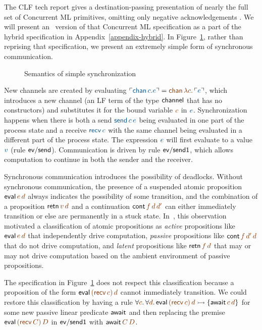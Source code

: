 The CLF tech report gives a destination-passing presentation of
nearly the full set of Concurrent ML primitives, omitting only
negative acknowledgements \cite{cervesato02concurrent}. We will
present an \sls~version of that Concurrent ML specification as a part
of the hybrid specification in Appendix~\ref{appendix-hybrid}.
In Figure~\ref{fig:dest-synch}, rather than reprising that
specification, we present an extremely simple form of synchronous
communication.


\begin{figure}
\caption{Semantics of simple synchronization}
\label{fig:dest-synch}
\end{figure}

New channels are created by evaluating $\interp{{\sf chan}\,c.e} =
\lf{{\sf chan}\,\lambda c.\,\interp{e}}$, which introduces a new channel
(an LF term of the type ${\sf channel}$ that has no constructors) and
substitutes it for the bound variable $\lf{c}$ in $\obj{e}$. 
Synchronization happens when
there is both a send $\obj{{\sf send}\,c\,e}$ being evaluated
in one part of the process state and a
receive $\obj{{\sf recv}\,c}$ with the same
channel being evaluated in a different part of the process state. 
The expression $\obj{e}$ will first evaluate to a value $\obj{v}$ 
(rule ${\sf ev/send}$). Communication is
driven by rule ${\sf ev/send1}$, which allows computation to continue
in both the sender and the receiver.

Synchronous communication introduces the possibility of
deadlocks. Without synchronous communication, the presence of a
suspended atomic proposition ${\sf eval}\,\lf{e}\,\lf{d}$ always
indicates the possibility of some transition, and the combination of a
proposition ${\sf retn}\,\lf{v}\,\lf{d}$ and a continuation ${\sf
  cont}\,\lf{f}\,\lf{d}\,\lf{d'}$ can either immediately transition or
else are permanently in a stuck
state. In~\cite{pfenning09substructural}, this observation motivated a
classification of atomic propositions as {\it active} propositions
like ${\sf eval}\,\lf{e}\,\lf{d}$ that independently drive
computation, {\it passive} propositions like ${\sf
  cont}\,\lf{f}\,\lf{d'}\,\lf{d}$ that do not drive computation, and
{\it latent} propositions like ${\sf retn}\,\lf{f}\,\lf{d}$ that may
or may not drive computation based on the ambient environment of
passive propositions. 

The specification in Figure~\ref{fig:dest-synch}
does not respect this classification because a proposition of the form
${\sf eval}\,\lf{({\sf recv}\,c)}\,\lf{d}$ cannot immediately
transition. We could restore this classification by having a rule
$\forall \lf{c}.\,\forall \lf{d}.\, {\sf eval}\,\lf{({\sf
    recv}\,c)}\,\lf{d} \lefti \{ {\sf await}\,\lf{c}\,\lf{d} \}$ for
some new passive linear predicate ${\sf await}$ and then replacing the
premise ${\sf eval}\,\lf{({\sf recv}\,C)}\,\lf{D}$ in ${\sf ev/send1}$
with ${\sf await}\,\lf{C}\,\lf{D}$.

